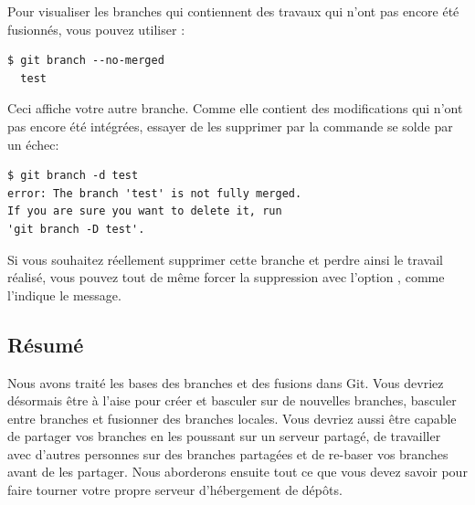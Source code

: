 Pour visualiser les branches qui contiennent des travaux qui n'ont pas encore été fusionnés, vous pouvez utiliser   :
\begin{Schunk}
\begin{Verbatim}
$ git branch --no-merged
  test
\end{Verbatim}
\end{Schunk}

Ceci affiche votre autre branche.
Comme elle contient des modifications qui n'ont pas encore été intégrées, essayer de les supprimer par la commande  se solde par un échec:
\begin{Schunk}
\begin{Verbatim}
$ git branch -d test
error: The branch 'test' is not fully merged.
If you are sure you want to delete it, run
'git branch -D test'.
\end{Verbatim}
\end{Schunk}

Si vous souhaitez réellement supprimer cette branche et perdre ainsi le travail réalisé, vous pouvez tout de même forcer la suppression avec l'option , comme l'indique le message.

\subsection{Résumé}

Nous avons traité les bases des branches et des fusions dans Git.
Vous devriez désormais être à l'aise pour créer et basculer sur de nouvelles branches, basculer entre branches et fusionner des branches locales.
Vous devriez aussi être capable de partager vos branches en les poussant sur un serveur partagé, de travailler avec d'autres personnes sur des branches partagées et de re-baser vos branches avant de les partager.
Nous aborderons ensuite tout ce que vous devez savoir pour faire tourner votre propre serveur d'hébergement de dépôts.


